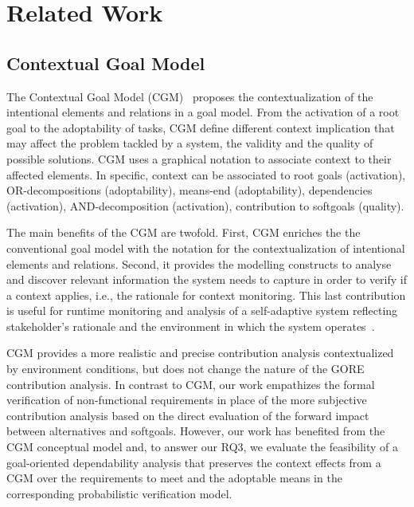 \chapter{Related Work}\label{ch:related_work}


\section{Contextual Goal Model}

The Contextual Goal Model (CGM)~\cite{Ali:2010} proposes the contextualization of the intentional elements and relations in a goal model. From the activation of a root goal to the adoptability of tasks, CGM define different context implication that may affect the problem tackled by a system, the validity and the quality of possible solutions. CGM uses a graphical notation to associate context to their affected elements. In specific, context can be associated to root goals (activation), OR-decompositions (adoptability), means-end (adoptability), dependencies (activation), AND-decomposition (activation), contribution to softgoals (quality). 


The main benefits of the CGM are twofold. First, CGM enriches the the conventional goal model with the notation for the contextualization of intentional elements and relations. Second, it provides the modelling constructs to analyse and discover relevant information the system needs to capture in order to verify if a context applies, i.e., the rationale for context monitoring. This last contribution is useful for runtime monitoring and analysis of a self-adaptive system reflecting stakeholder's rationale and the environment in which the system operates~\cite{Ali:2010}. 

CGM provides a more realistic and precise contribution analysis contextualized by environment conditions, but does not change the nature of the GORE contribution analysis. In contrast to CGM, our work empathizes the formal verification of non-functional requirements in place of the more subjective contribution analysis based on the direct evaluation of the forward impact between alternatives and softgoals. However, our work has benefited from the CGM conceptual model and, to answer our RQ3, we evaluate the feasibility of a goal-oriented dependability analysis that preserves the context effects from a CGM over the requirements to meet and the adoptable means in the corresponding probabilistic verification model. 


